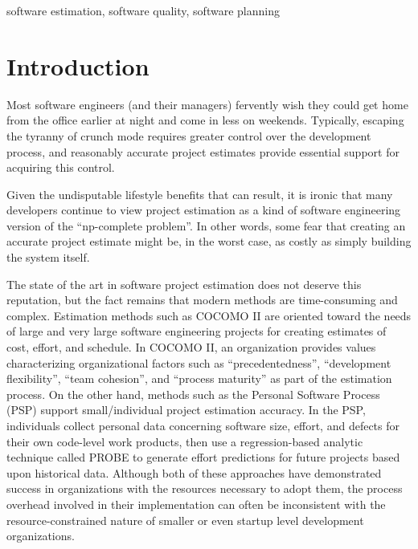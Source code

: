  software estimation, software quality, software planning

\pagestyle{plain}

\section{Introduction}

Most software engineers (and their managers) fervently wish they could get
home from the office earlier at night and come in less on weekends. Typically,
escaping the tyranny of crunch mode requires greater
control over the development process, and reasonably accurate project
estimates provide essential support for acquiring this control.

Given the undisputable lifestyle benefits that can result, it is ironic
that many developers continue to view project estimation as a kind of
software engineering version of the ``np-complete problem''. In other
words, some fear that creating an accurate project estimate might be, in the worst
case, as costly as simply building the system itself.

The state of the art in software project estimation does not deserve this
reputation, but the fact remains that modern methods are time-consuming and
complex. Estimation methods such as COCOMO II \cite{Boehm95} are oriented
toward the needs of large and very large software engineering projects for
creating estimates of cost, effort, and schedule.  In COCOMO II, an
organization provides values characterizing organizational factors such as
``precedentedness'', ``development flexibility'', ``team cohesion'', and
``process maturity'' as part of the estimation process.  On the other hand,
methods such as the Personal Software Process (PSP) \cite{Humphrey95} support
small/individual project estimation accuracy.  In the PSP,
individuals collect personal data concerning software size, effort, and
defects for their own code-level work products, then use a regression-based
analytic technique called PROBE to generate effort predictions for future
projects based upon historical data.   Although both of these approaches
have demonstrated success in organizations with the resources necessary to
adopt them, the process overhead involved in their implementation can often
be inconsistent with the resource-constrained nature of smaller or even
startup level development organizations.

